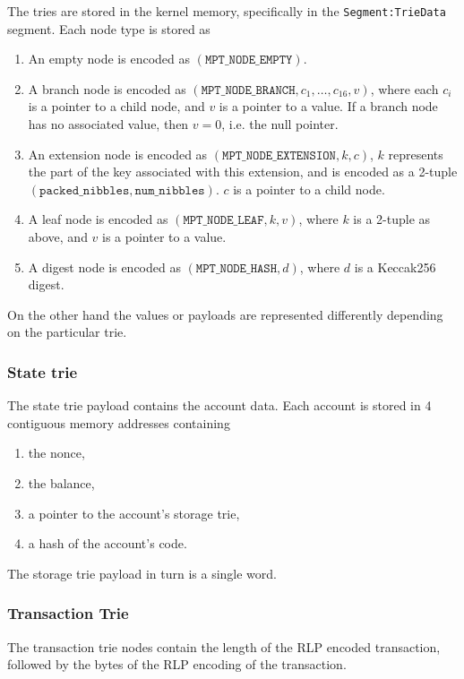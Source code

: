 The tries are stored in the kernel memory, specifically in the {\tt Segment:TrieData} segment. Each node type is stored as
\begin{enumerate}
  \item An empty node is encoded as $(\texttt{MPT\_NODE\_EMPTY})$.
  \item A branch node is encoded as $(\texttt{MPT\_NODE\_BRANCH}, c_1, \dots, c_{16}, v)$, where each $c_i$ is a pointer to a child node, and $v$ is a pointer to a value. If a branch node has no associated value, then $v = 0$, i.e. the null pointer.
  \item An extension node is encoded as $(\texttt{MPT\_NODE\_EXTENSION}, k, c)$, $k$ represents the part of the key associated with this extension, and is encoded as a 2-tuple $(\texttt{packed\_nibbles}, \texttt{num\_nibbles})$. $c$ is a pointer to a child node.
  \item A leaf node is encoded as $(\texttt{MPT\_NODE\_LEAF}, k, v)$, where $k$ is a 2-tuple as above, and $v$ is a pointer to a value.
  \item A digest node is encoded as $(\texttt{MPT\_NODE\_HASH}, d)$, where $d$ is a Keccak256 digest.
\end{enumerate}

On the other hand the values or payloads are represented differently depending on the particular trie.

\subsubsection{State trie}
The state trie payload contains the account data. Each account is stored in 4 contiguous memory addresses containing
\begin{enumerate}
	\item the nonce,
	\item the balance,
	\item a pointer to the account's storage trie,
	\item a hash of the account's code.
\end{enumerate}
The storage trie payload in turn is a single word.

\subsubsection{Transaction Trie}
The transaction trie nodes contain the length of the RLP encoded transaction, followed by the bytes of the RLP encoding of the transaction.

